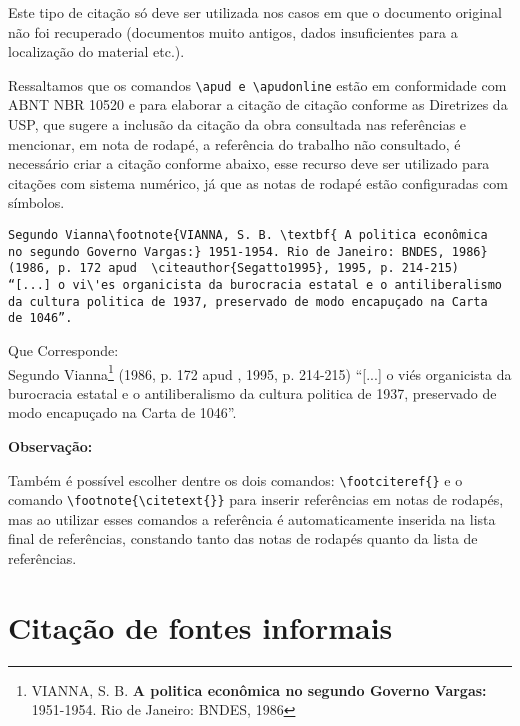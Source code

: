 Este tipo de citação só deve ser utilizada nos casos em que o documento original não foi recuperado (documentos muito antigos, dados insuficientes para a localização do material etc.).

Ressaltamos que os comandos \verb+\apud e \apudonline+ estão em conformidade com ABNT NBR 10520 e para elaborar a citação de citação conforme as Diretrizes da USP, que sugere a inclusão da citação da obra consultada nas refer\^encias e mencionar, em nota de rodap\'e, a refer\^encia do trabalho não consultado, \'e necess\'ario criar a citação conforme abaixo, esse recurso deve ser utilizado para citações com sistema num\'erico, j\'a que as notas de rodap\'e estão configuradas com símbolos. 



\begin{alineas}
\item 
\begin{verbatim}
Segundo Vianna\footnote{VIANNA, S. B. \textbf{ A politica econômica 
no segundo Governo Vargas:} 1951-1954. Rio de Janeiro: BNDES, 1986}
(1986, p. 172 apud  \citeauthor{Segatto1995}, 1995, p. 214-215) 
“[...] o vi\'es organicista da burocracia estatal e o antiliberalismo 
da cultura politica de 1937, preservado de modo encapuçado na Carta 
de 1046”.
\end{verbatim}
\end{alineas}


Que Corresponde: \\

Segundo Vianna\footnote{VIANNA, S. B.\textbf{ A politica econômica no segundo Governo Vargas:} 1951-1954. Rio de Janeiro: BNDES, 1986} (1986, p. 172 apud \citeauthor{Segatto1995}, 1995, p. 214-215) “[...] o vi\'es organicista da burocracia estatal e o antiliberalismo da cultura politica de 1937, preservado de modo encapuçado na Carta de 1046”.

\newpage

\textbf{Observação:}

Tamb\'em \'e possível escolher dentre os dois comandos: \verb+\footciteref{}+ e o comando \verb+\footnote{\citetext{}}+ para inserir refer\^encias em notas de rodap\'es, mas ao utilizar esses comandos a refer\^encia \'e automaticamente inserida na lista final de refer\^encias, constando tanto das notas de rodap\'es quanto da lista de refer\^encias.

\section{Citação de fontes informais}

